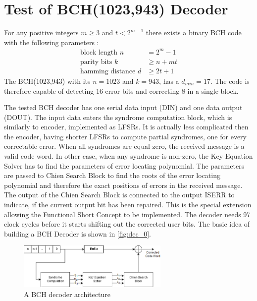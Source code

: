 \section{Test of BCH(1023,943) Decoder}
For any positive integers $m \geq 3$ and $t<2^{m-1}$ there exists a binary BCH code with the following parameters \cite{art:BCH_implement}:
\begin{subequations}
\begin{align}
    \text{block length }n&=2^{m}-1\label{eq:blck_len}\\
    \text{parity bits }k&\geq n+mt\label{eq:parity}\\
    \text{hamming distance }d&\geq2t+1\label{eq:dmin}
\end{align}
\end{subequations}
The BCH(1023,943) with its $n = 1023$ and $k=943$, has a $d_{min}= 17$. The code is therefore capable of detecting 16 error bits and correcting 8 in a single block. 

The tested BCH decoder has one serial data input (DIN) and one data output (DOUT). The input data enters the syndrome computation block, which is similarly to encoder, implemented as LFSRs. It is actually less complicated then the encoder, having shorter LFSRs to compute partial syndromes, one for every correctable error. When all syndromes are equal zero, the received message is a valid code word. In other case, when any syndrome is non-zero, the Key Equation Solver has to find the parameters of error locating polynomial. The parameters are passed to Chien Search Block to find the roots of the error locating polynomial and therefore the exact positions of errors in the received message. The output of the Chien Search Block is connected to the output ISERR to indicate, if the current output bit has been repaired. This is the special extension allowing the Functional Short Concept to be implemented. The decoder needs 97 clock cycles before it starts shifting out the corrected user bits. The basic idea of building a BCH Decoder is shown in \autoref{fig:dec_0}.

\begin{figure}[h]
\centering
\includegraphics[width=0.65\textwidth]{figures/BCH_DEC.png}
\caption{A BCH decoder architecture \cite{art:BCH_implement}}
\label{fig:dec_0}
\end{figure}

